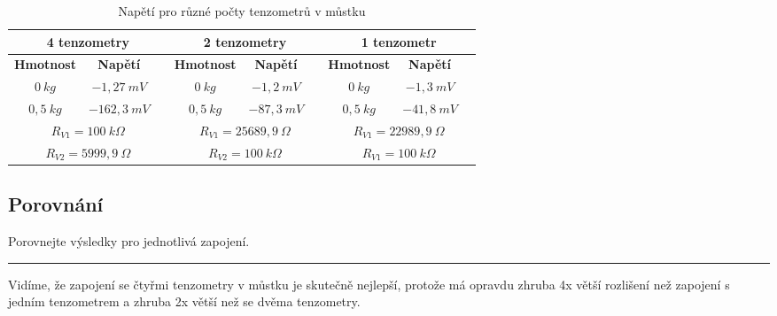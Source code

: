 \documentclass[a4paper,12pt]{article}
\begin{document}
\begin{table}[H]
\centering
\begin{tabular}{|c|cc|c|cc|c|cc|}
\hline
\multicolumn{3}{|c|}{\textbf{4 tenzometry}} & 
\multicolumn{3}{c|}{\textbf{2 tenzometry}} & 
\multicolumn{3}{c|}{\textbf{1 tenzometr}} \\ \hline

\textbf{Hmotnost} & \textbf{Napětí} &  &
\textbf{Hmotnost} & \textbf{Napětí} &  &
\textbf{Hmotnost} & \textbf{Napětí} &  \\ \hline

$0\ kg$ & $-1,27\ mV$ &  & $0\ kg$ & $-1,2\ mV$ &  & $0\ kg$ & $-1,3\ mV$ &  \\ \hline
$0,5\ kg$ & $-162,3\ mV$ &  & $0,5\ kg$ & $-87,3\ mV$ &  & $0,5\ kg$ & $-41,8\ mV$ &  \\ \hline

\multicolumn{3}{|c|}{$R_{V1}=100\ k\Omega$} &
\multicolumn{3}{c|}{$R_{V1}=25689,9\ \Omega$} &
\multicolumn{3}{c|}{$R_{V1}=22989,9\ \Omega$} \\ \hline

\multicolumn{3}{|c|}{$R_{V2}=5999,9\ \Omega$} &
\multicolumn{3}{c|}{$R_{V2}=100\ k\Omega$} &
\multicolumn{3}{c|}{$R_{V1}=100\ k\Omega$} \\ \hline

\end{tabular}
\caption{Napětí pro různé počty tenzometrů v můstku}
\end{table}

\subsection{Porovnání}
Porovnejte výsledky pro jednotlivá zapojení.
\par\noindent\rule{\textwidth}{0.4pt}

Vidíme, že zapojení se čtyřmi tenzometry v můstku je skutečně nejlepší, protože má opravdu zhruba 4x větší rozlišení než zapojení s jedním tenzometrem a zhruba 2x větší než se dvěma tenzometry.
\end{document}
